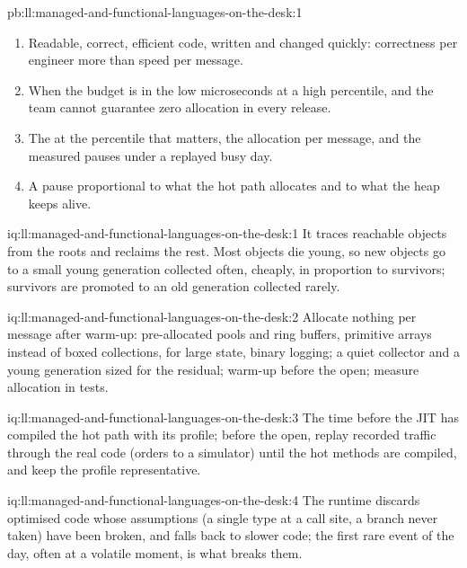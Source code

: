 \begin{solution}{pb:ll:managed-and-functional-languages-on-the-desk:1}
\begin{enumerate}
collection over the live heap.
\item Readable, correct, efficient code, written and changed quickly: correctness per engineer more than speed per message.
\item When the budget is in the low microseconds at a high percentile, and the team cannot guarantee zero allocation in
every release.
\item The  at the percentile that matters, the allocation per message, and the measured pauses under a
replayed busy day.
\item A pause proportional to what the hot path allocates and to what the heap keeps alive.
\end{enumerate}
\end{solution}

\begin{solution}{iq:ll:managed-and-functional-languages-on-the-desk:1}
It traces reachable objects from the roots and reclaims the rest. Most objects die young, so new objects go to a small young
generation collected often, cheaply, in proportion to survivors; survivors are promoted to an old generation collected
rarely.
\end{solution}

\begin{solution}{iq:ll:managed-and-functional-languages-on-the-desk:2}
Allocate nothing per message after warm-up: pre-allocated pools and ring buffers, primitive arrays instead of boxed
collections,  for large state, binary logging; a quiet collector and a young generation sized for the
residual; warm-up before the open; measure allocation in tests.
\end{solution}

\begin{solution}{iq:ll:managed-and-functional-languages-on-the-desk:3}
The time before the JIT has compiled the hot path with its profile; before the open, replay recorded traffic through the
real code (orders to a simulator) until the hot methods are compiled, and keep the profile representative.
\end{solution}

\begin{solution}{iq:ll:managed-and-functional-languages-on-the-desk:4}
The runtime discards optimised code whose assumptions (a single type at a call site, a branch never taken) have been broken,
and falls back to slower code; the first rare event of the day, often at a volatile moment, is what breaks them.
\end{solution}

